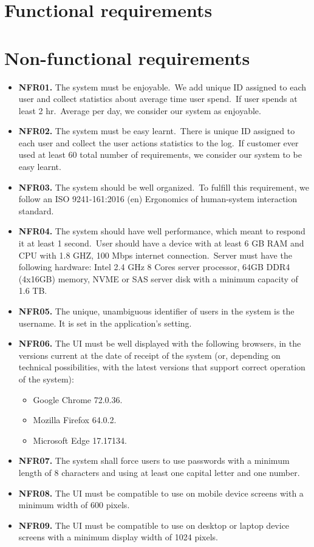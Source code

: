 \section{Functional requirements}\label{sec:functional-requirements}


\section{Non-functional requirements}\label{sec:non-functional-requirements}
\begin{itemize}
    \item \textbf{NFR01.} The system must be enjoyable.\ We add unique ID assigned to each user and
    collect statistics about average time user spend.\ If user spends at least 2 hr.\ Average
    per day, we consider our system as enjoyable.
    \item \textbf{NFR02.} The system must be easy learnt.\ There is unique ID assigned to each user and
    collect the user actions statistics to the log.\ If customer ever used at least 60%
    total number of requirements, we consider our system to be easy learnt.
    \item \textbf{NFR03.} The system should be well organized.\ To fulfill this requirement, we follow an
    ISO 9241-161:2016 (en) Ergonomics of human-system interaction standard.
    \item \textbf{NFR04.} The system should have well performance, which meant to respond it at
    least 1 second.\ User should have a device with at least 6 GB RAM and CPU with 1.8
    GHZ, 100 Mbps internet connection.\ Server must have the following hardware: Intel
    2.4 GHz 8 Cores server processor, 64GB DDR4 (4x16GB) memory, NVME or SAS
    server disk with a minimum capacity of 1.6 TB.
    \item \textbf{NFR05.} The unique, unambiguous identifier of users in the system is the username. It
    is set in the application’s setting.
    \item \textbf{NFR06.} The UI must be well displayed with the following browsers, in the versions
    current at the date of receipt of the system (or, depending on technical possibilities,
    with the latest versions that support correct operation of the system):
    \begin{itemize}
        \item Google Chrome 72.0.36.
        \item Mozilla Firefox 64.0.2.
        \item Microsoft Edge 17.17134.
    \end{itemize}
    \item \textbf{NFR07.} The system shall force users to use passwords with a minimum length of 8
    characters and using at least one capital letter and one number.
    \item \textbf{NFR08.} The UI must be compatible to use on mobile device screens with a minimum
    width of 600 pixels.
    \item \textbf{NFR09.} The UI must be compatible to use on desktop or laptop device screens with a
    minimum display width of 1024 pixels.
\end{itemize}
